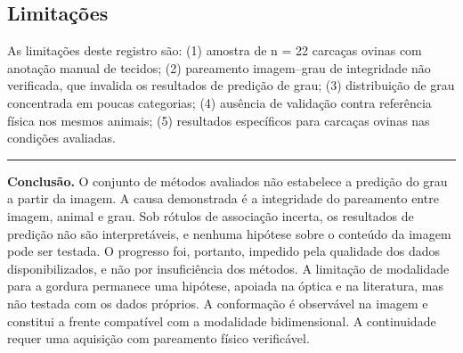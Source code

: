 \documentclass[12pt,a4paper]{article}
\begin{document}
\subsection{Limitações}

As limitações deste registro são: (1) amostra de n = 22 carcaças ovinas com anotação
manual de tecidos; (2) pareamento imagem--grau de integridade não verificada, que
invalida os resultados de predição de grau; (3) distribuição de grau concentrada em
poucas categorias; (4) ausência de validação contra referência física nos mesmos
animais; (5) resultados específicos para carcaças ovinas nas condições avaliadas.

\vspace{0.4em}
\hrule
\vspace{0.6em}

\textbf{Conclusão.} O conjunto de métodos avaliados não estabelece a predição do grau a
partir da imagem. A causa demonstrada é a integridade do pareamento entre imagem, animal
e grau. Sob rótulos de associação incerta, os resultados de predição não são
interpretáveis, e nenhuma hipótese sobre o conteúdo da imagem pode ser testada. O
progresso foi, portanto, impedido pela qualidade dos dados disponibilizados, e não por
insuficiência dos métodos. A limitação de modalidade para a gordura permanece uma
hipótese, apoiada na óptica e na literatura, mas não testada com os dados próprios. A
conformação é observável na imagem e constitui a frente compatível com a modalidade
bidimensional. A continuidade requer uma aquisição com pareamento físico verificável.
\end{document}
